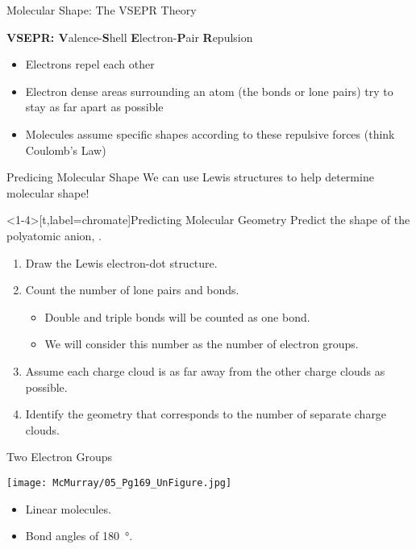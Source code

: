 \documentclass[notes=hide]{beamer}
\begin{document}
\begin{frame}{Molecular Shape: The VSEPR Theory}

	\textbf{VSEPR: V}alence-\textbf{S}hell \textbf{E}lectron-\textbf{P}air
	\textbf{R}epulsion

	\begin{itemize}
		\item Electrons repel each other
		\item Electron dense areas surrounding an atom (the bonds or
			lone pairs) try to stay as far apart as possible
		\item Molecules assume specific shapes according to these
			repulsive forces (think Coulomb's Law)
	\end{itemize}

	\medskip

	\pause
	\begin{alertblock}{Predicing Molecular Shape}
		We can use \alert{Lewis structures} to help determine
		molecular \alert{shape}!
	\end{alertblock}
\end{frame}

\begin{frame}<1-4>[t,label=chromate]{Predicting Molecular Geometry}
	Predict the shape of the polyatomic anion, .

	\bigskip

	\begin{enumerate}[<+(1)->]
		\item Draw the Lewis electron-dot structure.
		\item Count the number of lone pairs and bonds.
			\begin{itemize}[<1->]
				\item Double and triple bonds will be counted as
					one bond.
				\item We will consider this number as the number
					of \alert{electron groups}.
			\end{itemize} 
		\item Assume each charge cloud is as far away from the
			other charge clouds as possible.
		\item Identify the geometry that corresponds to the number of
			separate charge clouds.
	\end{enumerate}
\end{frame}


\begin{frame}{Two Electron Groups}
	\begin{center}
		\texttt{[image: McMurray/05\_Pg169\_UnFigure.jpg]}
	\end{center}

	\bigskip
	
	\begin{itemize}
		\item \alert{Linear} molecules.
		\item Bond angles of \SI{180}{\degree}.
	\end{itemize}
\end{frame}
\end{document}
